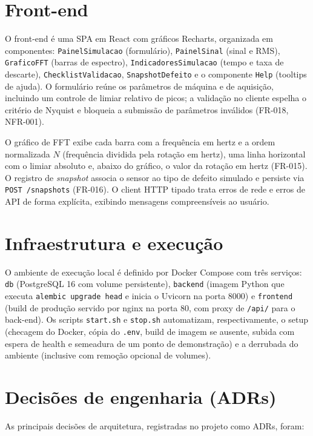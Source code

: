 \section{Front-end}

O front-end é uma SPA em React com gráficos Recharts, organizada em
componentes: \texttt{PainelSimulacao} (formulário), \texttt{PainelSinal} (sinal e RMS),
\texttt{GraficoFFT} (barras de espectro), \texttt{IndicadoresSimulacao} (tempo e taxa de
descarte), \texttt{ChecklistValidacao}, \texttt{SnapshotDefeito} e o componente \texttt{Help}
(tooltips de ajuda). O formulário reúne os parâmetros de máquina e de
aquisição, incluindo um controle de limiar relativo de picos; a validação no
cliente espelha o critério de Nyquist e bloqueia a submissão de parâmetros
inválidos (FR-018, NFR-001).

O gráfico de FFT exibe cada barra com a frequência em hertz e a ordem
normalizada \(N\) (frequência dividida pela rotação em hertz), uma linha
horizontal com o limiar absoluto e, abaixo do gráfico, o valor da rotação em
hertz (FR-015). O registro de \emph{snapshot} associa o sensor ao tipo de
defeito simulado e persiste via \texttt{POST /snapshots} (FR-016). O client HTTP
tipado trata erros de rede e erros de API de forma explícita, exibindo
mensagens compreensíveis ao usuário.

\section{Infraestrutura e execução}

O ambiente de execução local é definido por Docker Compose com três serviços:
\texttt{db} (PostgreSQL 16 com volume persistente), \texttt{backend} (imagem Python que executa
\texttt{alembic upgrade head} e inicia o Uvicorn na porta 8000) e \texttt{frontend} (build de
produção servido por nginx na porta 80, com proxy de \texttt{/api/} para o back-end).
Os scripts \texttt{start.sh} e \texttt{stop.sh} automatizam, respectivamente, o setup (checagem
do Docker, cópia do \texttt{.env}, build de imagem se ausente, subida com espera de
health e semeadura de um ponto de demonstração) e a derrubada do ambiente
(inclusive com remoção opcional de volumes).

\section{Decisões de engenharia (ADRs)}

As principais decisões de arquitetura, registradas no projeto como ADRs, foram:

